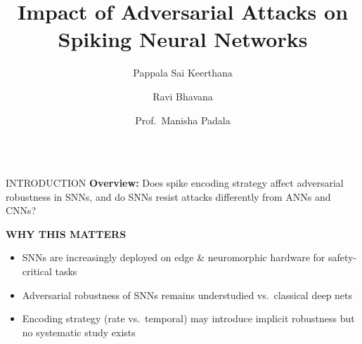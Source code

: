 \documentclass[final]{beamer}
\title{Impact of Adversarial Attacks on Spiking Neural Networks}
\author{\large Pappala Sai Keerthana \and Ravi Bhavana \and Prof.\ Manisha Padala}
\institute{\large Indian Institute of Technology Gandhinagar}
\newlength{\colone}
\begin{document}
\begin{frame}[t]
\begin{columns}[t]

\begin{column}{\colone}

  \begin{block}{INTRODUCTION}
    \textbf{Overview:} Does spike encoding strategy affect adversarial robustness in SNNs,
    and do SNNs resist attacks differently from ANNs and CNNs?

    

    \begin{highlightbox}
      \centering
      {\textcolor{iitgnblue}{\large \textbf{WHY THIS MATTERS}}}

      
      \begin{itemize}
        \item {\color{gray!120} SNNs are increasingly deployed on edge \& neuromorphic hardware for safety-critical tasks}
        \item {\color{gray!120} Adversarial robustness of SNNs remains understudied vs.\ classical deep nets}
        \item {\color{gray!120} Encoding strategy (rate vs.\ temporal) may introduce implicit robustness but no systematic study exists}
      \end{itemize}
    \end{highlightbox}
  \end{block}


\end{column}
\end{columns}
\end{frame}
\end{document}
